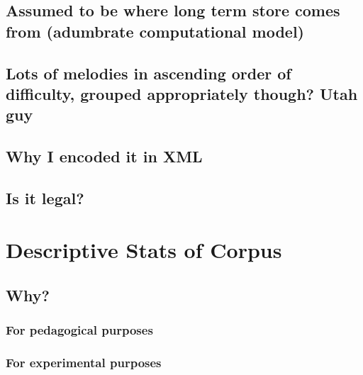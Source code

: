 \documentclass[]{book}
\theoremstyle{definition}
\theoremstyle{definition}
\theoremstyle{definition}
\theoremstyle{remark}
\begin{document}
\hypertarget{assumed-to-be-where-long-term-store-comes-from-adumbrate-computational-model}{%
\subsection{Assumed to be where long term store comes from (adumbrate
computational
model)}\label{assumed-to-be-where-long-term-store-comes-from-adumbrate-computational-model}}

\hypertarget{lots-of-melodies-in-ascending-order-of-difficulty-grouped-appropriately-though-utah-guy}{%
\subsection{Lots of melodies in ascending order of difficulty, grouped
appropriately though? Utah
guy}\label{lots-of-melodies-in-ascending-order-of-difficulty-grouped-appropriately-though-utah-guy}}

\hypertarget{why-i-encoded-it-in-xml}{%
\subsection{Why I encoded it in XML}\label{why-i-encoded-it-in-xml}}

\hypertarget{is-it-legal}{%
\subsection{Is it legal?}\label{is-it-legal}}

\hypertarget{descriptive-stats-of-corpus}{%
\section{Descriptive Stats of
Corpus}\label{descriptive-stats-of-corpus}}

\hypertarget{why-1}{%
\subsection{Why?}\label{why-1}}

\hypertarget{for-pedagogical-purposes}{%
\subsubsection{For pedagogical
purposes}\label{for-pedagogical-purposes}}

\hypertarget{for-experimental-purposes}{%
\subsubsection{For experimental
purposes}\label{for-experimental-purposes}}
\end{document}
